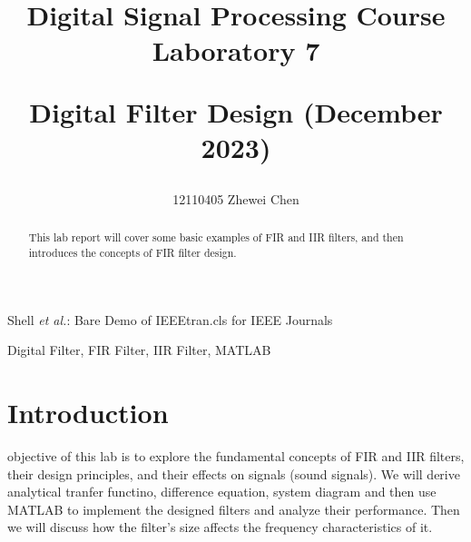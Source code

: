 \documentclass[journal]{IEEEtran}
\begin{document}
\title{\color[rgb]{0,0.6,1}Digital Signal Processing Course Laboratory 7 

Digital Filter Design (December 2023)}

\author{12110405   Zhewei Chen}

{Shell \MakeLowercase{\textit{et al.}}: Bare Demo of IEEEtran.cls for IEEE Journals}
\maketitle

\begin{abstract}
   This lab report will cover some basic examples of FIR and IIR filters, and then introduces the
   concepts of FIR filter design.
\end{abstract}

\begin{IEEEkeywords}
   Digital Filter, FIR Filter, IIR Filter, MATLAB
\end{IEEEkeywords}


\IEEEpeerreviewmaketitle



\section{Introduction}
 objective of this lab is to explore the fundamental concepts of FIR and IIR filters, their design principles, and their effects on signals (sound signals). We  will derive analytical tranfer functino, difference equation, system diagram and then use MATLAB to implement the designed filters and analyze their performance. Then we will discuss how the filter's size affects the frequency characteristics of it.
\end{document}
